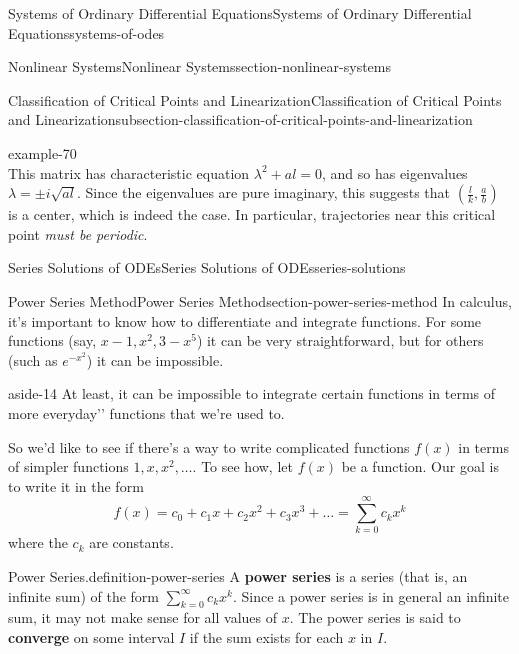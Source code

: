 \documentclass[oneside,10pt,]{book}
\newcommand{\terminology}[1]{\textbf{#1}}
\numberwithin{equation}{section}
\begin{document}
\begin{chapterptx}{Systems of Ordinary Differential Equations}{}{Systems of Ordinary Differential Equations}{}{}{systems-of-odes}
\begin{sectionptx}{Nonlinear Systems}{}{Nonlinear Systems}{}{}{section-nonlinear-systems}
\begin{subsectionptx}{Classification of Critical Points and Linearization}{}{Classification of Critical Points and Linearization}{}{}{subsection-classification-of-critical-points-and-linearization}
\begin{example}{}{example-70}
\begin{equation*}
\end{equation*}
This matrix has characteristic equation \(\lambda^{2} + al = 0\), and so has eigenvalues \(\lambda=\pm i\sqrt{al}\). Since the eigenvalues are pure imaginary, this suggests that \((\frac{l}{k},\frac{a}{b})\) is a center, which is indeed the case. In particular, trajectories near this critical point \emph{must be periodic}.%
\end{example}
\end{subsectionptx}
\end{sectionptx}
\end{chapterptx}
%
%
\typeout{************************************************}
\typeout{************************************************}
%
\begin{chapterptx}{Series Solutions of ODEs}{}{Series Solutions of ODEs}{}{}{series-solutions}
%
%
\typeout{************************************************}
\typeout{************************************************}
%
\begin{sectionptx}{Power Series Method}{}{Power Series Method}{}{}{section-power-series-method}
\hypertarget{p-423}{}%
In calculus, it's important to know how to differentiate and integrate functions. For some functions (say, \(x-1,x^{2},3-x^{5}\)) it can be very straightforward, but for others (such as \(e^{-x^{2}}\)) it can be impossible. \begin{aside}{}{aside-14}%
\hypertarget{p-424}{}%
At least, it can be impossible to integrate certain functions in terms of more \textasciigrave{}\textasciigrave{}everyday'{}'{} functions that we're used to.%
\end{aside}
%
\par
\hypertarget{p-425}{}%
So we'd like to see if there's a way to write complicated functions \(f(x)\) in terms of simpler functions \(1,x,x^{2},\dots\). To see how, let \(f(x)\) be a function. Our goal is to write it in the form%
\begin{equation}
f(x) = c_{0}+c_{1}x+c_{2}x^{2}+c_{3}x^{3}+\dots = \sum_{k=0}^{\infty}c_{k}x^{k}\label{equation-power-series-at-zero}
\end{equation}
where the \(c_{k}\) are constants.%
\begin{definition}{Power Series.}{definition-power-series}%
\hypertarget{p-426}{}%
A \terminology{power series} is a series (that is, an infinite sum) of the form \(\sum_{k=0}^{\infty}c_{k}x^{k}\). Since a power series is in general an infinite sum, it may not make sense for all values of \(x\). The power series is said to \terminology{converge} on some interval \(I\) if the sum exists for each \(x\) in \(I\).%

\end{definition}
\end{sectionptx}
\end{chapterptx}
\end{document}
